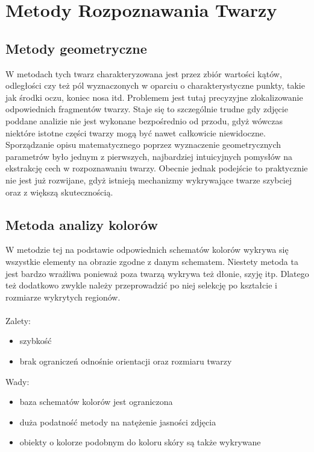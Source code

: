 \documentclass[11pt,a4paper]{article}
\begin{document}
\section{Metody Rozpoznawania Twarzy}

\subsection{Metody geometryczne}
W metodach tych twarz charakteryzowana jest przez zbiór wartości kątów, odległości czy też pól wyznaczonych w oparciu o charakterystyczne punkty, takie jak środki oczu, koniec nosa itd. Problemem jest tutaj precyzyjne zlokalizowanie odpowiednich fragmentów twarzy. Staje się to szczególnie trudne gdy zdjęcie poddane analizie nie jest wykonane bezpośrednio od przodu, gdyż wówczas niektóre istotne części twarzy mogą być nawet całkowicie niewidoczne. Sporządzanie opisu matematycznego poprzez wyznaczenie geometrycznych parametrów było jednym z pierwszych, najbardziej intuicyjnych pomysłów na ekstrakcję cech w rozpoznawaniu twarzy. Obecnie jednak podejście to praktycznie nie jest już rozwijane, gdyż istnieją mechanizmy wykrywające twarze szybciej oraz z większą skutecznością.

\subsection{Metoda analizy kolorów}
W metodzie tej na podstawie odpowiednich schematów kolorów wykrywa się wszystkie elementy na obrazie zgodne z danym schematem. Niestety metoda ta jest bardzo wrażliwa ponieważ poza twarzą wykrywa też dłonie, szyję itp. Dlatego też dodatkowo zwykle należy przeprowadzić po niej selekcję po kształcie i rozmiarze wykrytych regionów. 
\\
\\
\noindent Zalety:
\begin{itemize}
\item szybkość
\item brak ograniczeń odnośnie orientacji oraz rozmiaru twarzy
\end{itemize}

\noindent Wady:
\begin{itemize}
\item baza schematów kolorów jest ograniczona
\item duża podatność metody na natężenie jasności zdjęcia
\item obiekty o kolorze podobnym do koloru skóry są także wykrywane
\end{itemize}
\end{document}
